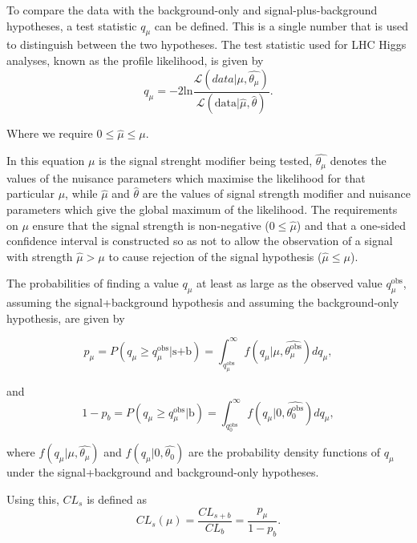 To compare the data with the background-only and signal-plus-background hypotheses, a test
statistic $q_{\mu}$ can be defined. This is a single 
number that is used to distinguish between the two hypotheses. The test
statistic used for LHC Higgs analyses, known as the profile likelihood, is given 
by
\begin{equation}\label{eqn:hhh_profilelikelihood}
q_{\mu} = -2\text{ln}\frac{\mathcal{L}(data|\mu,\hat{\theta_{\mu}})}{\mathcal{L}(\text{data}|\hat{\mu},\hat{\theta})}.
\end{equation}

Where we require $0 \leq \hat{\mu} \leq \mu$.

In this equation $\mu$ is the signal strenght modifier being tested, $\hat{\theta_{\mu}}$ denotes the values of the
nuisance parameters which maximise the likelihood for that particular $\mu$, while $\hat{\mu}$ and $\hat{\theta}$ are
the values of signal strength modifier and nuisance parameters which give the global maximum of the likelihood.
The requirements on $\mu$ ensure that the signal strength is non-negative ($ 0 \leq \hat{\mu}$) and that
a one-sided confidence interval is constructed so as not to allow the observation of  a 
signal with strength $\hat{\mu} > \mu$ to cause rejection of the signal hypothesis ($ \hat{\mu} \leq \mu$).

The probabilities of finding a value $q_{\mu}$ at least as large as the observed value $q_{\mu}^{\text{obs}}$, assuming the signal+background hypothesis
and assuming the background-only hypothesis, are given by

\begin{equation}\label{eqn:hhh_pvaluesig}
p_{\mu} = P(q_{\mu} \geq q_{\mu}^{\text{obs}} | \text{s+b}) = \int_{q_{\mu}^{\text{obs}}}^{\infty} f(q_{\mu} | \mu,\hat{\theta_{\mu}^{\text{obs}}}) dq_{\mu},
\end{equation}

and 
\begin{equation}\label{eqn:hhh_pvaluebkg}
1-p_b = P(q_{\mu} \geq q_{\mu}^{\text{obs}} | \text{b}) = \int_{q_{0}^{\text{obs}}}^{\infty} f(q_{\mu} | 0,\hat{\theta_{0}^{\text{obs}}}) dq_{\mu} ,
\end{equation}

where $f(q_{\mu}|\mu,\hat{\theta_{\mu}})$ and $f(q_{\mu} | 0,\hat{\theta_0})$ are the probability density functions of $q_{\mu}$ under
the signal+background and background-only hypotheses.

Using this, $CL_s$ is defined as
\begin{equation}\label{eqn:hhh_cls}
CL_s(\mu) = \frac{CL_{s+b}}{CL_b} = \frac{p_{\mu}}{1-p_b}.
\end{equation}


